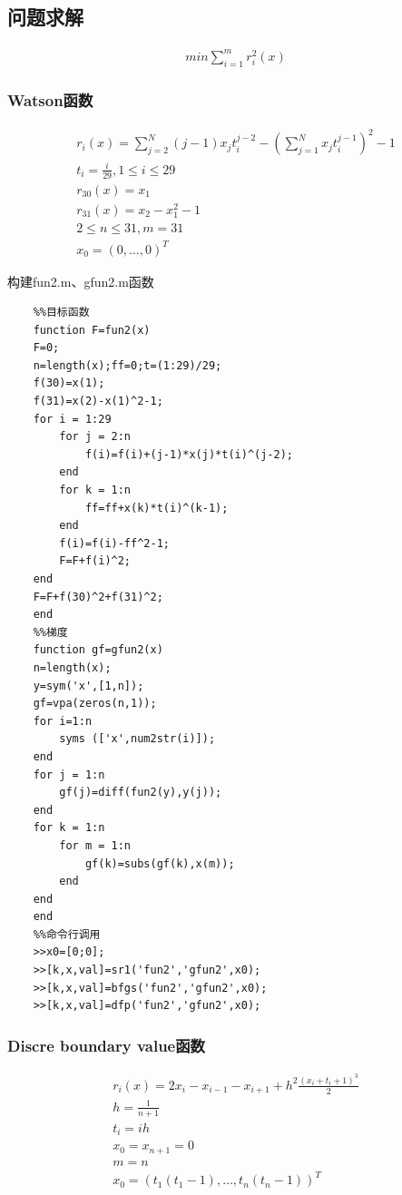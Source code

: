 \documentclass[12pt]{article} %
\begin{document}
	\subsection{问题求解}
	\begin{gather*}
	min\sum_{i=1}^{m}r_i^2(x)
	\end{gather*}
	\subsubsection{Watson函数}
	\begin{gather*}
	r_i(x)=\sum_{j=2}^{N} (j-1)x_jt_i^{j-2}-(\sum_{j=1}^{N} x_jt_i^{j-1})^2-1\\
	t_i=\frac{i}{29},1\le i\le 29\\
	r_{30}(x)=x_1\\
	r_{31}(x)=x_2-x_1^2-1\\
	2\le n\le31,m=31\\
	x_0=(0,\ldots,0)^T
	\end{gather*}
	
	构建fun2.m、gfun2.m函数
	\begin{lstlisting}
	%%目标函数
	function F=fun2(x)
	F=0;
	n=length(x);ff=0;t=(1:29)/29;
	f(30)=x(1);
	f(31)=x(2)-x(1)^2-1;
	for i = 1:29
		for j = 2:n
			f(i)=f(i)+(j-1)*x(j)*t(i)^(j-2);
		end
		for k = 1:n
			ff=ff+x(k)*t(i)^(k-1);
		end
		f(i)=f(i)-ff^2-1;
		F=F+f(i)^2;
	end
	F=F+f(30)^2+f(31)^2;
	end
	%%梯度
	function gf=gfun2(x)
	n=length(x);
	y=sym('x',[1,n]);
	gf=vpa(zeros(n,1));
	for i=1:n
		syms (['x',num2str(i)]);    
	end
	for j = 1:n
		gf(j)=diff(fun2(y),y(j));
	end
	for k = 1:n
		for m = 1:n
			gf(k)=subs(gf(k),x(m));
		end
	end
	end
	%%命令行调用
	>>x0=[0;0];
	>>[k,x,val]=sr1('fun2','gfun2',x0);
	>>[k,x,val]=bfgs('fun2','gfun2',x0);
	>>[k,x,val]=dfp('fun2','gfun2',x0);
	\end{lstlisting}
	\subsubsection{Discre boundary value函数}
	\begin{gather*}
	r_i(x)=2x_i-x_{i-1}-x_{i+1}+h^2\frac{(x_i+t_i+1)^3}{2}\\
	h=\frac{1}{n+1}\\
	t_i=ih\\
	x_0=x_{n+1}=0\\
	m=n\\
	x_0=(t_1(t_1-1),\ldots,t_n(t_n-1))^T
	\end{gather*}
	
\end{document}

